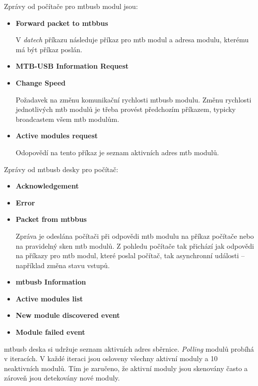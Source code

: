 Zprávy od počítače pro \gls{mtbusb} modul jsou:

\begin{itemize}
\item \textbf{Forward packet to \gls{mtbbus}}

V \textit{datech} příkazu následuje příkaz pro \gls{mtb} modul a adresa modulu,
kterému má být příkaz poslán.

\item \textbf{MTB-USB Information Request}

\item \textbf{Change Speed}

Požadavek na změnu komunikační rychlosti \gls{mtbusb} modulu. Změnu rychlosti
jednotlivých \gls{mtb} modulů je třeba provést předchozím příkazem, typicky
broadcastem všem \gls{mtb} modulům.

\item \textbf{Active modules request}

Odopovědí na tento příkaz je seznam aktivních adres \gls{mtb} modulů.
\end{itemize}

Zprávy od \gls{mtbusb} desky pro počítač:

\begin{itemize}
\item \textbf{Acknowledgement}
\item \textbf{Error}
\item \textbf{Packet from \gls{mtbbus}}

Zpráva je odeslána počítači při odpovědi \gls{mtb} modulu na příkaz počítače
nebo na pravidelný sken \gls{mtb} modulů. Z pohledu počítače tak přichází jak
odpovědi na příkazy pro \gls{mtb} modul, které poslal počítač, tak asynchronní
události – například změna stavu vstupů.

\item \textbf{\gls{mtbusb} Information}

\item \textbf{Active modules list}

\item \textbf{New module discovered event}

\item \textbf{Module failed event}

\end{itemize}

\gls{mtbusb} deska si udržuje seznam aktivních adres sběrnice. \textit{Polling}
modulů probíhá v iteracích. V každé iteraci jsou osloveny všechny aktivní
moduly a 10 neaktivních modulů. Tím je zaručeno, že aktivní moduly jsou
skenovány často a zároveň jsou detekovány nové moduly.

